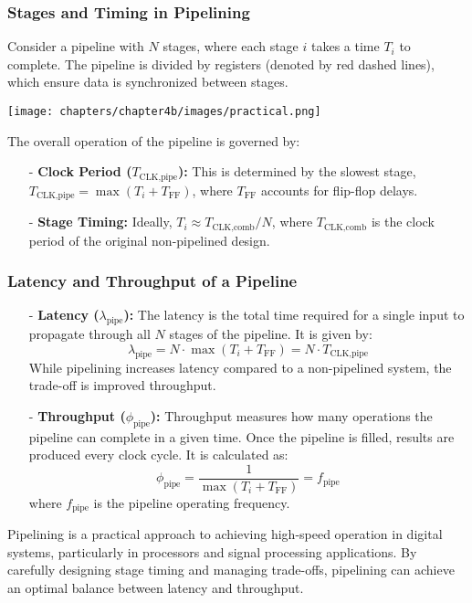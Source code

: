 \subsubsection*{Stages and Timing in Pipelining}
Consider a pipeline with $N$ stages, where each stage $i$ takes a time $T_i$ to complete. The pipeline is divided by registers (denoted by red dashed lines), which ensure data is synchronized between stages.
\begin{center}
    \texttt{[image: chapters/chapter4b/images/practical.png]}
\end{center}
The overall operation of the pipeline is governed by:
\begin{itemize}
    \item[-] \textbf{Clock Period ($T_\text{CLK,pipe}$):} This is determined by the slowest stage, $T_\text{CLK,pipe} = \max(T_i + T_\text{FF})$, where $T_\text{FF}$ accounts for flip-flop delays.
    \item[-] \textbf{Stage Timing:} Ideally, $T_i \approx T_\text{CLK,comb}/N$, where $T_\text{CLK,comb}$ is the clock period of the original non-pipelined design.
\end{itemize}

\subsubsection*{Latency and Throughput of a Pipeline}

\begin{itemize}
    \item[-] \textbf{Latency ($\lambda_\text{pipe}$):} The latency is the total time required for a single input to propagate through all $N$ stages of the pipeline. It is given by:
    \[
    \lambda_\text{pipe} = N \cdot \max(T_i + T_\text{FF}) = N \cdot T_\text{CLK,pipe}
    \]
    While pipelining increases latency compared to a non-pipelined system, the trade-off is improved throughput.

    \item[-] \textbf{Throughput ($\phi_\text{pipe}$):} Throughput measures how many operations the pipeline can complete in a given time. Once the pipeline is filled, results are produced every clock cycle. It is calculated as:
    \[
    \phi_\text{pipe} = \frac{1}{\max(T_i + T_\text{FF})} = f_\text{pipe}
    \]
    where $f_\text{pipe}$ is the pipeline operating frequency.
\end{itemize}

Pipelining is a practical approach to achieving high-speed operation in digital systems, particularly in processors and signal processing applications. By carefully designing stage timing and managing trade-offs, pipelining can achieve an optimal balance between latency and throughput.
